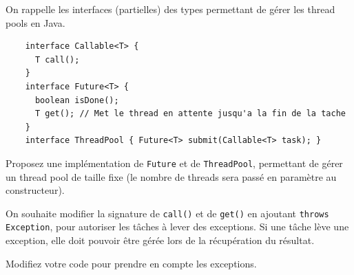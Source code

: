 
\begingroup

\begin{exercice}
  \label{exo:monitors/threadpool}

  On rappelle les interfaces (partielles) des types permettant de gérer les thread pools en Java.
  \begin{lstlisting}
    interface Callable<T> {
      T call();
    }
    interface Future<T> {
      boolean isDone();
      T get(); // Met le thread en attente jusqu'a la fin de la tache
    }
    interface ThreadPool { Future<T> submit(Callable<T> task); }
  \end{lstlisting}

  \begin{questions}
  \item Proposez une implémentation de \lstinline{Future} et de \lstinline{ThreadPool}, permettant de gérer un thread pool de taille fixe (le nombre de threads sera passé en paramètre au constructeur).  
  \end{questions}
  On souhaite modifier la signature de \lstinline{call()} et de \lstinline{get()} en ajoutant \lstinline{throws Exception},
  pour autoriser les tâches à lever des exceptions. Si une tâche lève une exception, elle doit pouvoir être gérée lors de la récupération du résultat.
  \begin{questions}
  \item Modifiez votre code pour prendre en compte les exceptions.
  \end{questions}
  
\end{exercice}

\endgroup
\endinput
